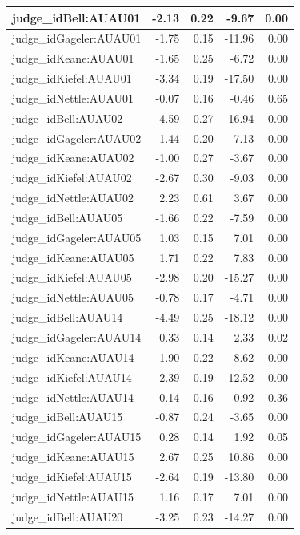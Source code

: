 \documentclass{monashthesis}
\begin{document}
\begin{tabular}{l|r|r|r|r}
\hline
judge\_idBell:AUAU01 & -2.13 & 0.22 & -9.67 & 0.00\\
\hline
judge\_idGageler:AUAU01 & -1.75 & 0.15 & -11.96 & 0.00\\
\hline
judge\_idKeane:AUAU01 & -1.65 & 0.25 & -6.72 & 0.00\\
\hline
judge\_idKiefel:AUAU01 & -3.34 & 0.19 & -17.50 & 0.00\\
\hline
judge\_idNettle:AUAU01 & -0.07 & 0.16 & -0.46 & 0.65\\
\hline
judge\_idBell:AUAU02 & -4.59 & 0.27 & -16.94 & 0.00\\
\hline
judge\_idGageler:AUAU02 & -1.44 & 0.20 & -7.13 & 0.00\\
\hline
judge\_idKeane:AUAU02 & -1.00 & 0.27 & -3.67 & 0.00\\
\hline
judge\_idKiefel:AUAU02 & -2.67 & 0.30 & -9.03 & 0.00\\
\hline
judge\_idNettle:AUAU02 & 2.23 & 0.61 & 3.67 & 0.00\\
\hline
judge\_idBell:AUAU05 & -1.66 & 0.22 & -7.59 & 0.00\\
\hline
judge\_idGageler:AUAU05 & 1.03 & 0.15 & 7.01 & 0.00\\
\hline
judge\_idKeane:AUAU05 & 1.71 & 0.22 & 7.83 & 0.00\\
\hline
judge\_idKiefel:AUAU05 & -2.98 & 0.20 & -15.27 & 0.00\\
\hline
judge\_idNettle:AUAU05 & -0.78 & 0.17 & -4.71 & 0.00\\
\hline
judge\_idBell:AUAU14 & -4.49 & 0.25 & -18.12 & 0.00\\
\hline
judge\_idGageler:AUAU14 & 0.33 & 0.14 & 2.33 & 0.02\\
\hline
judge\_idKeane:AUAU14 & 1.90 & 0.22 & 8.62 & 0.00\\
\hline
judge\_idKiefel:AUAU14 & -2.39 & 0.19 & -12.52 & 0.00\\
\hline
judge\_idNettle:AUAU14 & -0.14 & 0.16 & -0.92 & 0.36\\
\hline
judge\_idBell:AUAU15 & -0.87 & 0.24 & -3.65 & 0.00\\
\hline
judge\_idGageler:AUAU15 & 0.28 & 0.14 & 1.92 & 0.05\\
\hline
judge\_idKeane:AUAU15 & 2.67 & 0.25 & 10.86 & 0.00\\
\hline
judge\_idKiefel:AUAU15 & -2.64 & 0.19 & -13.80 & 0.00\\
\hline
judge\_idNettle:AUAU15 & 1.16 & 0.17 & 7.01 & 0.00\\
\hline
judge\_idBell:AUAU20 & -3.25 & 0.23 & -14.27 & 0.00\\

\end{tabular}
\end{document}
